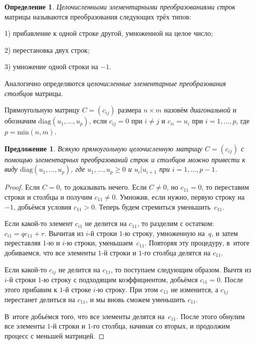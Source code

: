 \documentclass[a4paper,10pt]{amsart}
\newtheorem{proposition}{Предложение}
\theoremstyle{definition}
\newtheorem{definition}{Определение}
\theoremstyle{remark}
\begin{document}
\begin{definition}
{\it Целочисленными элементарными преобразованиями строк} матрицы
называются преобразования следующих трёх типов:

1) прибавление к одной строке другой, умноженной на целое число;

2) перестановка двух строк;

3) умножение одной строки на $-1$.

Аналогично определяются {\it целочисленные элементарные
преобразования столбцов} матрицы.
\end{definition}

Прямоугольную матрицу $C=(c_{ij})$ размера $n\times m$ назовём {\it
диагональной} и обозначим $\text{diag}(u_1,\ldots,u_p)$, если
$c_{ij}=0$ при $i\ne j$ и $c_{ii}=u_i$ при $i=1,\ldots,p$, где
$p=\text{min}(n,m)$.

\begin{proposition} \label{palg}
Всякую прямоугольную целочисленную матрицу $C=(c_{ij})$ с помощью
элементарных преобразований строк и столбцов можно привести к виду
$\text{diag}(u_1,\ldots,u_p)$, где $u_1,\ldots,u_p \geqslant 0$ и
$u_i|u_{i+1}$ при $i=1,\ldots,p-1$.
\end{proposition}

\begin{proof}
Если $C=0$, то доказывать нечего. Если $C\ne 0$, но $c_{11}=0$, то
переставим строки и столбцы и получим $c_{11}\ne 0$. Умножив, если
нужно, первую строку на $-1$, добьёмся условия $c_{11}>0$. Теперь
будем стремиться уменьшить~$c_{11}$.

Если какой-то элемент $c_{i1}$ не делится на $c_{11}$, то разделим с
остатком: $c_{i1}=qc_{11}+r$. Вычитая из $i$-й строки $1$-ю строку,
умноженную на~$q$, и затем переставляя $1$-ю и $i$-ю строки,
уменьшаем~$c_{11}$. Повторяя эту процедуру, в~итоге добиваемся, что
все элементы $1$-й строки и $1$-го столбца делятся на $c_{11}$.

Если какой-то $c_{ij}$ не делится на $c_{11}$, то поступаем
следующим образом. Вычтя из $i$-й строки $1$-ю строку с подходящим
коэффициентом, добьёмся $c_{i1}=0$. После этого прибавим к $1$-й
строке $i$-ю строку. При этом $c_{11}$ не изменится, а $c_{1j}$
перестанет делиться на $c_{11}$, и мы вновь сможем уменьшить
$c_{11}$.

В~итоге добьёмся того, что все элементы делятся на~$c_{11}$. После
этого обнулим все элементы $1$-й строки и $1$-го столбца, начиная со
вторых, и продолжим процесс с меньшей матрицей.
\end{proof}
\end{document}
